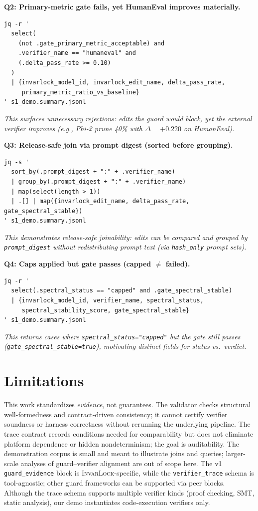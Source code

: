 \documentclass{article} %
\newcommand{\invarlock}{\textsc{InvarLock}\xspace}
\begin{document}
\textbf{Q2: Primary-metric gate fails, yet HumanEval improves materially.}
\begin{lstlisting}
jq -r '
  select(
    (not .gate_primary_metric_acceptable) and
    .verifier_name == "humaneval" and
    (.delta_pass_rate >= 0.10)
  )
  | {invarlock_model_id, invarlock_edit_name, delta_pass_rate,
     primary_metric_ratio_vs_baseline}
' s1_demo.summary.jsonl
\end{lstlisting}
\noindent\emph{This surfaces unnecessary rejections: edits the guard would block, yet the external
verifier improves (e.g., Phi-2 prune 40\% with $\Delta=+0.220$ on HumanEval).}

\textbf{Q3: Release-safe join via prompt digest (sorted before grouping).}
\begin{lstlisting}
jq -s '
  sort_by(.prompt_digest + ":" + .verifier_name)
  | group_by(.prompt_digest + ":" + .verifier_name)
  | map(select(length > 1))
  | .[] | map({invarlock_edit_name, delta_pass_rate, gate_spectral_stable})
' s1_demo.summary.jsonl
\end{lstlisting}
\noindent\emph{This demonstrates release-safe joinability: edits can be compared and grouped by
\texttt{prompt\_digest} without redistributing prompt text (via \texttt{hash\_only} prompt sets).}

\textbf{Q4: Caps applied but gate passes (capped $\neq$ failed).}
\begin{lstlisting}
jq -r '
  select(.spectral_status == "capped" and .gate_spectral_stable)
  | {invarlock_model_id, verifier_name, spectral_status,
     spectral_stability_score, gate_spectral_stable}
' s1_demo.summary.jsonl
\end{lstlisting}
\noindent\emph{This returns cases where \texttt{spectral\_status="capped"} but the gate still passes
(\texttt{gate\_spectral\_stable=true}), motivating distinct fields for status vs.\ verdict.}

\section{Limitations}
This work standardizes \emph{evidence}, not guarantees.
The validator checks structural well-formedness and contract-driven consistency; it cannot certify
verifier soundness or harness correctness without rerunning the underlying pipeline.
The trace contract records conditions needed for comparability but does not eliminate platform
dependence or hidden nondeterminism; the goal is auditability.
The demonstration corpus is small and meant to illustrate joins and queries; larger-scale analyses
of guard--verifier alignment are out of scope here.
The v1 \texttt{guard\_evidence} block is \invarlock-specific, while the \texttt{verifier\_trace} schema
is tool-agnostic; other guard frameworks can be supported via peer blocks.
Although the trace schema supports multiple verifier kinds (proof checking, SMT, static analysis),
our demo instantiates code-execution verifiers only.
\end{document}
